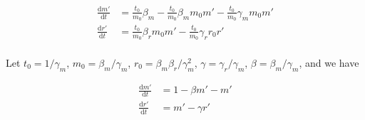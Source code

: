 \documentclass{ucetd}
\begin{document}
\begin{align}
\frac{\mathrm{d}m'}{\mathrm{d}t} &= \frac{t_0}{m_0}\beta_{m} - \frac{t_0}{m_0}\beta_{m}m_{0}m' - \frac{t_0}{m_0}\gamma_m m_{0}m'\\
\frac{\mathrm{d}r'}{\mathrm{d}t} &= \frac{t_0}{m_0}\beta_{r} m_{0}m' - \frac{t_0}{m_0}\gamma_r r_{0}r'\\
\end{align}

Let $t_{0} = 1/\gamma_{m}$, $m_{0} = \beta_{m}/\gamma_{m}$, $r_{0} = \beta_{m}\beta_{r}/\gamma_{m}^{2}$, $\gamma = \gamma_{r}/\gamma_{m}$, $\beta = \beta_{m}/\gamma_{m}$, and we have

\begin{align}
\frac{\mathrm{d}m'}{\mathrm{d}t} &= 1 - \beta m' - m'\\
\frac{\mathrm{d}r'}{\mathrm{d}t} &= m' - \gamma r'\\
\end{align}
\end{document}
